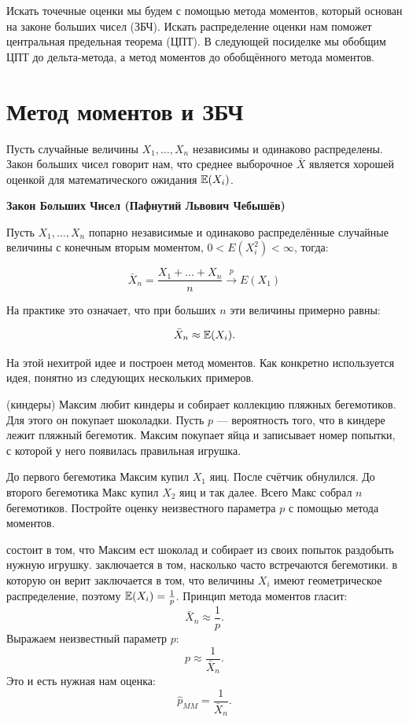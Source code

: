 \documentclass[12pt, a4paper, oneside]{article}
\begin{document}
Искать точечные оценки мы будем с помощью метода моментов, который основан на законе больших чисел (ЗБЧ). Искать распределение оценки нам поможет центральная предельная теорема (ЦПТ). В следующей посиделке мы обобщим ЦПТ до дельта-метода, а метод моментов до обобщённого метода моментов. 

\section{Метод моментов и ЗБЧ}

Пусть случайные величины $X_{1}, \ldots, X_{n}$ независимы и одинаково распределены. Закон больших чисел говорит нам, что среднее выборочное $\bar{X}$ является хорошей оценкой для математического ожидания $ \mathbb{E}(X_{i}) $.

\begin{theorem}{\textbf{Закон Больших Чисел (Пафнутий Львович Чебышёв)}}

Пусть $X_1, \ldots, X_n$ попарно независимые и одинаково распределённые случайные величины с конечным вторым моментом, $0 < E(X_i^2) < \infty$, тогда:

$$
\bar{X}_{n} = \frac{X_1 + \ldots + X_n}{n} \stackrel{p}{\longrightarrow} E(X_1)
$$
\end{theorem}

На практике это означает, что при больших $n$ эти величины примерно равны:

\[
\bar{X}_{n} \approx \mathbb{E}(X_{i}).
\]

На этой нехитрой идее и построен метод моментов. Как конкретно используется идея, понятно из следующих нескольких примеров.

\begin{problem}{(киндеры)}
    Максим любит киндеры и собирает коллекцию пляжных бегемотиков. Для этого он покупает шоколадки. Пусть $p$ --- вероятность того, что в киндере лежит пляжный бегемотик. Максим покупает яйца и записывает номер попытки, с которой у него появилась правильная игрушка.
    
    До первого бегемотика Максим купил $X_1$ яиц. После счётчик обнулился. До второго бегемотика Макс купил $X_2$ яиц и так далее. Всего Макс собрал $n$ бегемотиков. Постройте оценку неизвестного параметра $p$ с помощью метода моментов.
\end{problem}

\begin{sol}
 состоит в том, что Максим ест шоколад и собирает  из своих попыток раздобыть нужную игрушку.  заключается в том, насколько часто встречаются бегемотики.  в которую он верит заключается в том, что величины $X_{i}$ имеют геометрическое распределение, поэтому $\mathbb{E}(X_{i})=\frac{1}{p}$. Принцип метода моментов гласит:
	\[ \bar{X}_{n}\approx \frac{1}{p}.\]
	Выражаем неизвестный параметр $ p $:
	\[ p\approx \frac{1}{\bar{X}_{n}}. \]
	Это и есть нужная нам оценка:
	\[ \hat{p}_{MM} = \frac{1}{\bar{X}_{n}}. \]
\end{sol}
\end{document}
